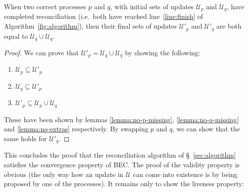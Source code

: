 \documentclass[a4paper,anonymous,USenglish]{lipics-v2019}
\begin{document}
\begin{theorem}\label{theorem:convergence}
When two correct processes $p$ and $q$, with initial sets of updates $\mathcal{U}_p$ and $\mathcal{U}_q$, have completed reconciliation (i.e.\ both have reached line~\ref{line:finish} of Algorithm~\ref{fig:algorithm}), then their final sets of updates $\mathcal{U}'_p$ and $\mathcal{U}'_q$  are both equal to $\mathcal{U}_q \cup \mathcal{U}_q$.
\end{theorem}
\begin{proof}
We can prove that $\mathcal{U}'_p = \mathcal{U}_q \cup \mathcal{U}_q$ by showing the following:
\begin{enumerate}
   \item $\mathcal{U}_p \subseteq \mathcal{U}'_p$
   \item $\mathcal{U}_q \subseteq \mathcal{U}'_p$
   \item $\mathcal{U}'_p \subseteq \mathcal{U}_p \cup \mathcal{U}_q$
\end{enumerate}

These have been shown by lemmas \ref{lemma:no-p-missing}, \ref{lemma:no-q-missing} and \ref{lemma:no-extras} respectively.  
By swapping $p$ and $q$, we can show that the same holds for $\mathcal{U}'_q$.
\end{proof}

This concludes the proof that the reconciliation algorithm of \S~\ref{sec:algorithm} satisfies the convergence property of BEC.
The proof of the validity property is obvious (the only way how an update in $\mathcal{U}$ can come into existence is by being proposed by one of the processes).
It remains only to show the liveness property:
\end{document}
